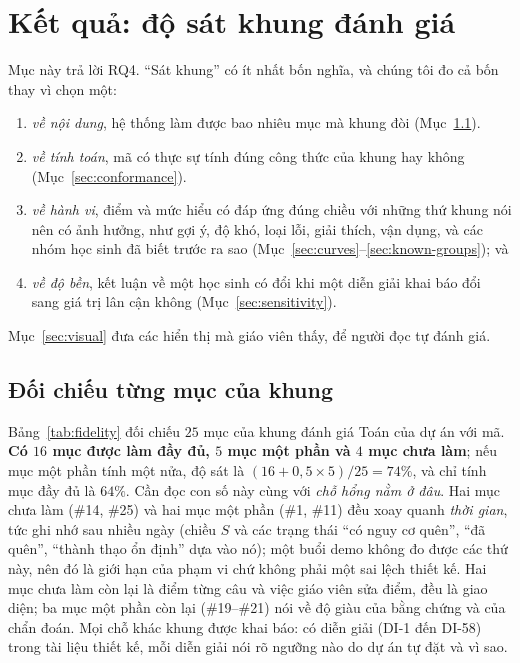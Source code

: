 \section{Kết quả: độ sát khung đánh giá}\label{sec:res-assess}

Mục này trả lời RQ4. ``Sát khung'' có ít nhất bốn nghĩa, và chúng tôi đo cả bốn thay vì chọn một:
\begin{enumerate}[label=(\roman*)]
  \item \emph{về nội dung}, hệ thống làm được bao nhiêu mục mà khung đòi (Mục~\ref{sec:fidelity}).
  \item \emph{về tính toán}, mã có thực sự tính đúng công thức của khung hay không (Mục~\ref{sec:conformance}).
  \item \emph{về hành vi}, điểm và mức hiểu có đáp ứng đúng chiều với những thứ khung nói nên có ảnh hưởng, như gợi ý, độ khó, loại lỗi, giải thích, vận dụng, và các nhóm học sinh đã biết trước ra sao (Mục~\ref{sec:curves}--\ref{sec:known-groups}); và
  \item \emph{về độ bền}, kết luận về một học sinh có đổi khi một diễn giải khai báo đổi sang giá trị lân cận không (Mục~\ref{sec:sensitivity}).
\end{enumerate}
Mục~\ref{sec:visual} đưa các hiển thị mà giáo viên thấy, để người đọc tự đánh giá.

\subsection{Đối chiếu từng mục của khung}\label{sec:fidelity}
Bảng~\ref{tab:fidelity} đối chiếu $25$ mục của khung đánh giá Toán của dự án với mã. \textbf{Có $16$ mục được làm đầy đủ, $5$ mục một phần và $4$ mục chưa làm}; nếu mục một phần tính một nửa, độ sát là $(16+0{,}5\times5)/25=74\%$, và chỉ tính mục đầy đủ là $64\%$. Cần đọc con số này cùng với \emph{chỗ hổng nằm ở đâu}. Hai mục chưa làm (\#14, \#25) và hai mục một phần (\#1, \#11) đều xoay quanh \emph{thời gian}, tức ghi nhớ sau nhiều ngày (chiều $S$ và các trạng thái ``có nguy cơ quên'', ``đã quên'', ``thành thạo ổn định'' dựa vào nó); một buổi demo không đo được các thứ này, nên đó là giới hạn của phạm vi chứ không phải một sai lệch thiết kế. Hai mục chưa làm còn lại là điểm từng câu và việc giáo viên sửa điểm, đều là giao diện; ba mục một phần còn lại (\#19--\#21) nói về độ giàu của bằng chứng và của chẩn đoán. Mọi chỗ khác khung được khai báo: có \NDIs{} diễn giải (DI-1 đến DI-58) trong tài liệu thiết kế, mỗi diễn giải nói rõ ngưỡng nào do dự án tự đặt và vì sao.

